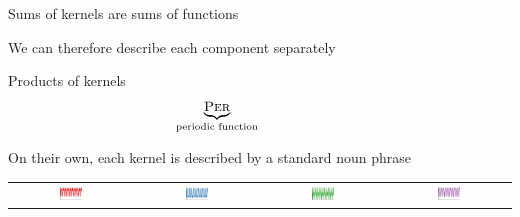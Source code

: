 \begin{frame}{Sums of kernels are sums of functions}
\vspace{\baselineskip}

We can therefore describe each component separately

\end{frame}

\begin{frame}{Products of kernels}
  \begin{align*}
    \phantom{\underbrace{\kSE}_{\textnormal{\scriptsize approximately}} \times }
    \underbrace{\kPer}_{\textnormal{\scriptsize periodic function}} \phantom{\times 
    \underbrace{\kLin}_{\textnormal{\scriptsize with linearly growing amplitude}}}
  \end{align*}
  
  \vspace{\baselineskip}
  
  On their own, each kernel is described by a standard noun phrase
  
  \vspace{\baselineskip}
  
  \begin{block}{}
    \begin{tabular}{cccc}
      \includegraphics[width=0.2\textwidth]{figures/trans_samples/draw_11} &
      \includegraphics[width=0.2\textwidth]{figures/trans_samples/draw_12} &
      \includegraphics[width=0.2\textwidth]{figures/trans_samples/draw_13} &
      \includegraphics[width=0.2\textwidth]{figures/trans_samples/draw_14}
    \end{tabular}
  \end{block}
\end{frame}

